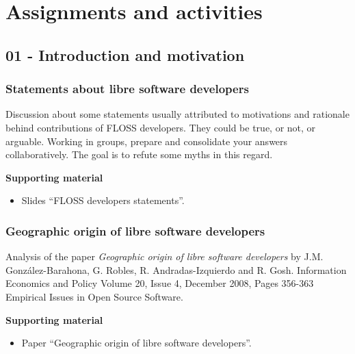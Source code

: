 \documentclass[a4paper]{article}
\begin{document}
\section{Assignments and activities}

\subsection{01 - Introduction and motivation}


\subsubsection{Statements about libre software developers}
\label{sub:statements-devs}
Discussion about some statements usually attributed to motivations and rationale behind contributions of FLOSS developers. 
They could be true, or not, or arguable. Working in groups, prepare and consolidate your answers collaboratively. The goal is to refute some myths in this regard.

\textbf{Supporting material}

\begin{itemize}
\item Slides ``FLOSS developers statements''.
\end{itemize}

\subsubsection{Geographic origin of libre software developers}
\label{sub:geo-origin-devs}

Analysis of the paper \textit{Geographic origin of libre software developers} by J.M. González-Barahona,
  G. Robles, R. Andradas-Izquierdo and R. Gosh. Information Economics and Policy Volume 20, Issue 4, December 2008, Pages 356-363
  Empirical Issues in Open Source Software.

\textbf{Supporting material}

\begin{itemize}
\item Paper ``Geographic origin of libre software developers''.
\end{itemize}
\end{document}
